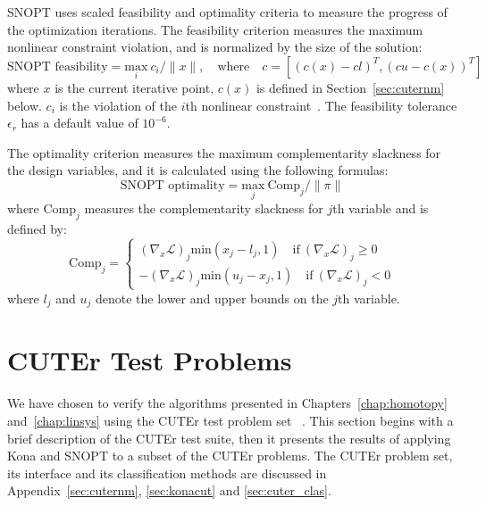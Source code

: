 SNOPT uses scaled feasibility and optimality criteria 
 to measure the progress of the 
optimization iterations. The feasibility criterion measures the maximum nonlinear constraint violation, 
and is normalized by the size of the solution:
\begin{equation*}
\text{SNOPT feasibility} = \underset{i}{\text{max}}  \  c_i / \lVert x \rVert, \quad \text{where} \quad c= \left[ ( c(x) - cl)^T, (cu -c(x) )^T \right]   
\end{equation*}        
where $x$ is the current iterative point, $c(x)$ is defined in Section~\ref{sec:cuternm} below. 
$c_i$ is the violation of the $i$th nonlinear constraint~\cite{snopt_manual}. The feasibility tolerance 
$\epsilon_r$ has a default value of $10^{-6}$.

The optimality criterion measures the maximum complementarity slackness for the design variables, 
and it is calculated using the following formulas:
\begin{equation*}
\text{SNOPT optimality} = \underset{j}{\text{max}}  \ \text{Comp}_j / \lVert \pi \rVert 
\end{equation*}
where $\text{Comp}_j$ measures the complementarity slackness for $j$th variable and is defined by:
\begin{equation*}
\text{Comp}_j = \begin{cases}
(\nabla_x \mathcal{L})_j \text{min} (x_j - l_j, 1)  \quad \text{if} \ (\nabla_x \mathcal{L})_j \geq 0 \\
-(\nabla_x \mathcal{L})_j \text{min} (u_j - x_j, 1) \quad \text{if} \ (\nabla_x \mathcal{L})_j < 0
\end{cases}
\end{equation*}
where $l_j$ and $u_j$ denote the lower and upper bounds on the $j$th variable. 

\section{CUTEr Test Problems}\label{sec:cuter1}
We have chosen to verify the algorithms presented in Chapters~\ref{chap:homotopy} and~\ref{chap:linsys}  using the CUTEr test problem set ~\cite{cuter_opt, cuter_gould}. This section begins with a brief description of the CUTEr test suite, then it presents the results of applying Kona and SNOPT to a subset of the CUTEr problems.
The CUTEr problem set, its interface and its classification methods are discussed in Appendix~\ref{sec:cuternm}, \ref{sec:konacut} and \ref{sec:cuter_clas}.  

